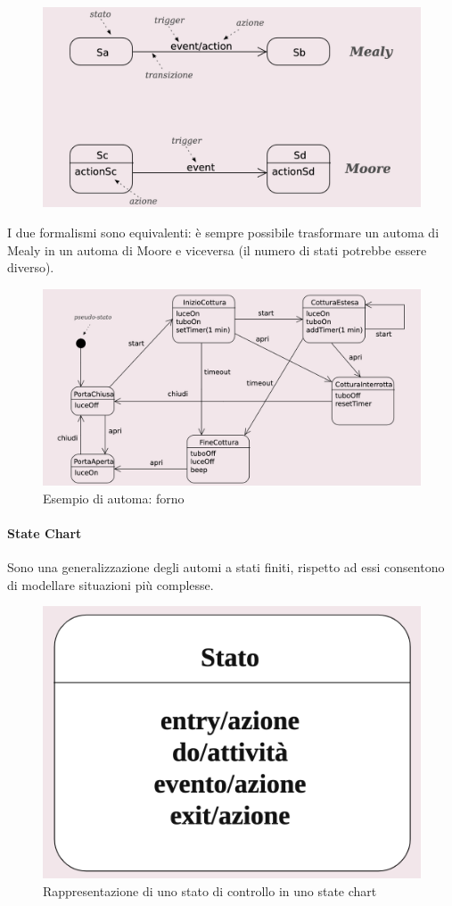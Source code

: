 \begin{figure}[h!]
    \centering
    \includegraphics[width=0.75\linewidth]{assets/UML/state/state1.png}
\end{figure}

I due formalismi sono equivalenti: è sempre possibile trasformare un automa di Mealy in un automa di Moore e viceversa (il numero di stati potrebbe essere diverso).

\begin{figure}[h!]
    \centering
    \includegraphics[width=0.75\linewidth]{assets/UML/state/state2.png}
    \caption{Esempio di automa: forno}
\end{figure}

\paragraph{State Chart} Sono una generalizzazione degli automi a stati finiti, rispetto ad essi consentono di modellare situazioni più complesse.

\begin{figure}[h!]
    \centering
    \includegraphics[width=0.25\linewidth]{assets/UML/state/state3.png}
    \caption{Rappresentazione di uno stato di controllo in uno state chart}
\end{figure}

